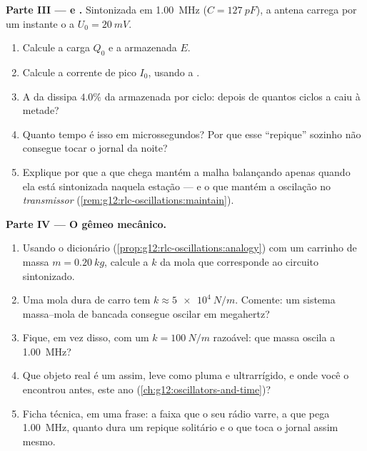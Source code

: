 \begin{problem}
\medskip
\noindent\textbf{Parte III ---  e .}
Sintonizada em \qty{1.00}{MHz} ($C = \qty{127}{pF}$), a antena carrega por um instante
o  a $U_0 = \qty{20}{mV}$.
\begin{enumerate}[resume]
  \item Calcule a carga $Q_0$ e a  armazenada $E$.
  \item Calcule a corrente de pico $I_0$, usando a .
  \item A  da  dissipa $4.0\%$ da  armazenada por ciclo: depois
        de quantos ciclos a  caiu à metade?
  \item Quanto tempo é isso em microssegundos? Por que esse ``repique'' sozinho não
        consegue tocar o jornal da noite?
  \item Explique por que a  que chega mantém a malha balançando apenas quando ela
        está sintonizada naquela estação --- e o que mantém a oscilação no
        \emph{transmissor} (\cref{rem:g12:rlc-oscillations:maintain}).
\end{enumerate}

\medskip
\noindent\textbf{Parte IV --- O gêmeo mecânico.}
\begin{enumerate}[resume]
  \item Usando o dicionário (\cref{prop:g12:rlc-oscillations:analogy}) com um carrinho
        de massa $m = \qty{0.20}{kg}$, calcule a  $k$ da mola que
        corresponde ao circuito sintonizado.
  \item Uma mola dura de carro tem $k \approx \qty{5e4}{N/m}$. Comente: um sistema
        massa--mola de bancada consegue oscilar em megahertz?
  \item Fique, em vez disso, com um $k = \qty{100}{N/m}$ razoável: que massa oscila a
        \qty{1.00}{MHz}?
  \item Que objeto real é um  assim, leve como pluma e ultrarrígido, e
        onde você o encontrou antes, este ano
        (\cref{ch:g12:oscillators-and-time})?
  \item Ficha técnica, em uma frase: a faixa que o seu rádio varre, a  que
        pega \qty{1.00}{MHz}, quanto dura um repique solitário e o que toca o jornal
        assim mesmo.
\end{enumerate}
\end{problem}
